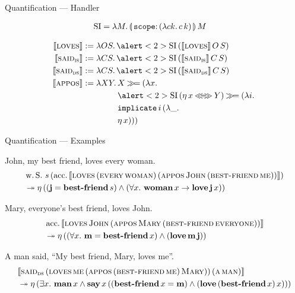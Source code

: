 \documentclass{beamer}
\begin{document}

\begin{frame}{Quantification --- Handler}
  
\begin{align*}
  \SI &= \lam{M}{\ap{\banana{\onto{\op{scope}}{(\lam{c k}{\ap{c}{k}})}}}{M}}
\end{align*}

\pause
\begin{align*}
  \sem{\abs{loves}} &:= \lam{O S}{\ap{\alert<2>{\SI}}{(\app{\sem{\abs{loves}}}{O}{S})}} \\
  \sem{\abs{said}_{\abs{is}}} &:= \lam{C S}{\ap{\alert<2>{\SI}}{(\app{\sem{\abs{said}_{\abs{is}}}}{C}{S})}} \\
  \sem{\abs{said}_{\abs{ds}}} &:= \lam{C S}{\ap{\alert<2>{\SI}}{(\app{\sem{\abs{said}_{\abs{ds}}}}{C}{S})}} \\
  \sem{\abs{appos}} &:= \lam{X Y}{\begin{aligned}[t]
      &X \hsbind (\lam{x}{ \\
      &\ap{\alert<2>{\SI}}{(\etaE{x} \eqlr Y)} \hsbind (\lam{i}{ \\
      &\app{\op{implicate}}{i}{(\lam{\_}{ \\
      &\etaE{x}})}})})
    \end{aligned}}
\end{align*}
\end{frame}


\begin{frame}{Quantification --- Examples}

John, my best friend, loves every woman.
\begin{align*}
  &\operatorname{w.S.}\,s\,(\operatorname{acc.}\,\llbracket \textsc{loves}\,(\textsc{every}\,\textsc{woman})\,(\textsc{appos}\,\textsc{John}\,(\textsc{best-friend}\,\textsc{me})) \rrbracket) \\
  &\twoheadrightarrow \eta\,((\textbf{j} = \textbf{best-friend}\,s) \land (\forall x.\ \textbf{woman}\,x \to \textbf{love}\,\textbf{j}\,x))
\end{align*}

Mary, everyone's best friend, loves John.
\begin{align*}
  &\operatorname{acc.}\,\llbracket \textsc{loves}\,\textsc{John}\,(\textsc{appos}\,\textsc{Mary}\,(\textsc{best-friend}\,\textsc{everyone})) \rrbracket \\
  &\twoheadrightarrow \eta\,((\forall x.\ \textbf{m} = \textbf{best-friend}\,x) \land (\textbf{love}\,\textbf{m}\,\textbf{j}))
\end{align*}

A man said, ``My best friend, Mary, loves me''.
\begin{align*}
  &\llbracket \textsc{said}_{\textsc{ds}}\,(\textsc{loves}\,\textsc{me}\,(\textsc{appos}\,(\textsc{best-friend}\,\textsc{me})\,\textsc{Mary}))\,(\textsc{a}\,\textsc{man}) \rrbracket \\
  &\twoheadrightarrow \eta\,(\exists x.\ \textbf{man}\,x \land \textbf{say}\,x\,((\textbf{best-friend}\,x = \textbf{m}) \land (\textbf{love}\,(\textbf{best-friend}\,x)\,x)))
\end{align*}
\end{frame}
\end{document}
